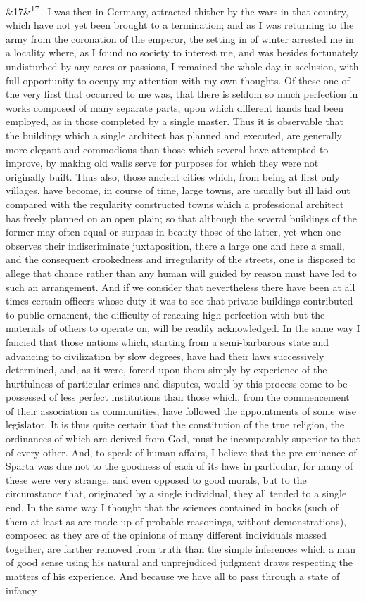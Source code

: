 \documentclass[12pt]{article}
\newcommand{\para}[1][]{\par\noindent\ifx&#1&\else\textsuperscript{\footnotesize #1}~\fi}
\begin{document}
\para[17] I was then in Germany, attracted thither by the wars in that country, which have not yet been brought to a termination; and as I was returning to the army from the coronation of the emperor, the setting in of winter arrested me in a locality where, as I found no society to interest me, and was besides fortunately undisturbed by any cares or passions, I remained the whole day in seclusion, with full opportunity to occupy my attention with my own thoughts. Of these one of the very first that occurred to me was, that there is seldom so much perfection in works composed of many separate parts, upon which different hands had been employed, as in those completed by a single master. Thus it is observable that the buildings which a single architect has planned and executed, are generally more elegant and commodious than those which several have attempted to improve, by making old walls serve for purposes for which they were not originally built. Thus also, those ancient cities which, from being at first only villages, have become, in course of time, large towns, are usually but ill laid out compared with the regularity constructed towns which a professional architect has freely planned on an open plain; so that although the several buildings of the former may often equal or surpass in beauty those of the latter, yet when one observes their indiscriminate juxtaposition, there a large one and here a small, and the consequent crookedness and irregularity of the streets, one is disposed to allege that chance rather than any human will guided by reason must have led to such an arrangement. And if we consider that nevertheless there have been at all times certain officers whose duty it was to see that private buildings contributed to public ornament, the difficulty of reaching high perfection with but the materials of others to operate on, will be readily acknowledged. In the same way I fancied that those nations which, starting from a semi-barbarous state and advancing to civilization by slow degrees, have had their laws successively determined, and, as it were, forced upon them simply by experience of the hurtfulness of particular crimes and disputes, would by this process come to be possessed of less perfect institutions than those which, from the commencement of their association as communities, have followed the appointments of some wise legislator. It is thus quite certain that the constitution of the true religion, the ordinances of which are derived from God, must be incomparably superior to that of every other. And, to speak of human affairs, I believe that the pre-eminence of Sparta was due not to the goodness of each of its laws in particular, for many of these were very strange, and even opposed to good morals, but to the circumstance that, originated by a single individual, they all tended to a single end. In the same way I thought that the sciences contained in books (such of them at least as are made up of probable reasonings, without demonstrations), composed as they are of the opinions of many different individuals massed together, are farther removed from truth than the simple inferences which a man of good sense using his natural and unprejudiced judgment draws respecting the matters of his experience. And because we have all to pass through a state of infancy 
\end{document}
